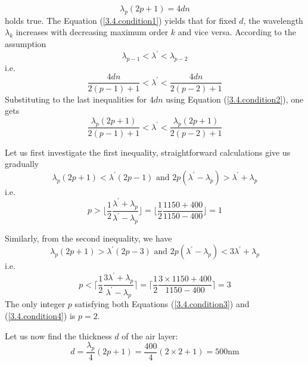 \documentclass[12pt,a4paper]{book}
\begin{document}
	\begin{equation}
		\lambda_p(2p+1)=4dn
		\label{3.4.condition2}
	\end{equation}
	holds true. The Equation (\ref{3.4.condition1}) yields that for f\mbox{}ixed $d$, the wavelength $\lambda_k$ increases with decreasing maximum order $k$ and vice versa. According to the assumption
	\begin{equation*}
		\lambda_{p-1}<\lambda^{'}<\lambda_{p-2}
	\end{equation*}
	i.e.
	\begin{equation*}
		\frac{4dn}{2(p-1)+1}<\lambda^{'}<\frac{4dn}{2(p-2)+1}
	\end{equation*}
	Substituting to the last inequalities for $4dn$ using Equation (\ref{3.4.condition2}), one gets
	\begin{equation*}
		\frac{\lambda_p(2p+1)}{2(p-1)+1}<\lambda^{'}<\frac{\lambda_p(2p+1)}{2(p-2)+1}
	\end{equation*}\par
	Let us f\mbox{}irst investigate the f\mbox{}irst inequality, straightforward calculations give us gradually
	\begin{equation*}
		\lambda_p(2p+1)<\lambda^{'}(2p-1)\text{ and }2p(\lambda^{'}-\lambda_p)>\lambda^{'}+\lambda_p
	\end{equation*}
	i.e.
	\begin{equation}
		p>\Bigg\lfloor\frac{1}{2}\frac{\lambda^{'}+\lambda_p}{\lambda^{'}-\lambda_p}\Bigg\rfloor=\Bigg\lfloor\frac{1}{2}\frac{1150+400}{1150-400}\Bigg\rfloor=1
		\label{3.4.condition3}
	\end{equation}\par
	Similarly, from the second inequality, we have
	\begin{equation*}
		\lambda_p(2p+1)>\lambda^{'}(2p-3)\text{ and }2p(\lambda^{'}-\lambda_p)<3\lambda^{'}+\lambda_p
	\end{equation*}
	i.e.
	\begin{equation}
		p<\Bigg\lceil\frac{1}{2}\frac{3\lambda^{'}+\lambda_p}{\lambda^{'}-\lambda_p}\Bigg\rceil=\Bigg\lceil\frac{1}{2}\frac{3\times1150+400}{1150-400}\Bigg\rceil=3
		\label{3.4.condition4}
	\end{equation}
	The only integer $p$ satisfying both Equations (\ref{3.4.condition3}) and (\ref{3.4.condition4}) is $p=2$.\par
	Let us now f\mbox{}ind the thickness $d$ of the air layer:
	\begin{equation*}
		d=\frac{\lambda_p}{4}(2p+1)=\frac{400}{4}(2\times2+1)=500\text{nm}
	\end{equation*}\par
\end{document}
